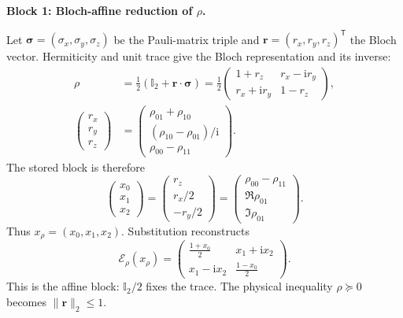 \documentclass[10pt,letterpaper,twocolumn]{article}
\newcommand{\I}{\mathbb I}
\newcommand{\ii}{\mathrm i}
\begin{document}
\textbf{Block 1: Bloch-affine reduction of \(\rho\).}

Let \(\bm\sigma=(\sigma_x,\sigma_y,\sigma_z)\) be the Pauli-matrix triple and
\(\bm r=(r_x,r_y,r_z)^{\mathsf T}\) the Bloch vector.  Hermiticity and unit
trace give the Bloch representation and its inverse:
\[
\begin{aligned}
\rho
&=\frac12(\I_2+\bm r\cdot\bm\sigma)
=\frac12
\begin{pmatrix}
1+r_z&r_x-\ii r_y\\
r_x+\ii r_y&1-r_z
\end{pmatrix},\\[2pt]
\begin{pmatrix}r_x\\r_y\\r_z\end{pmatrix}
&=
\begin{pmatrix}
\rho_{01}+\rho_{10}\\
(\rho_{10}-\rho_{01})/\ii\\
\rho_{00}-\rho_{11}
\end{pmatrix}.
\end{aligned}
\]
The stored block is therefore
\[
\begin{pmatrix}x_0\\x_1\\x_2\end{pmatrix}
=
\begin{pmatrix}r_z\\r_x/2\\-r_y/2\end{pmatrix}
=
\begin{pmatrix}
\rho_{00}-\rho_{11}\\
\Re\rho_{01}\\
\Im\rho_{01}
\end{pmatrix}.
\]
Thus \(x_\rho=(x_0,x_1,x_2)\).  Substitution reconstructs
\[
\boxed{\mathcal E_\rho(x_\rho)=
\begin{pmatrix}
\frac{1+x_0}{2} & x_1+\ii x_2\\
x_1-\ii x_2 & \frac{1-x_0}{2}
\end{pmatrix}.}
\tag{20}
\]
This is the affine block: \(\I_2/2\) fixes the trace.  The physical inequality
\(\rho\succeq0\) becomes \(\lVert\bm r\rVert_2\leq1\).
\end{document}
